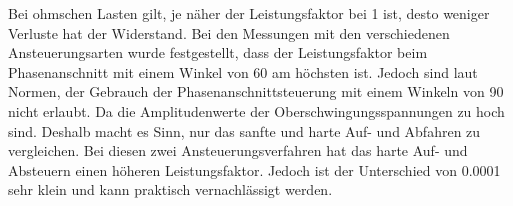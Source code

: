 Bei ohmschen Lasten gilt, je näher der Leistungsfaktor bei 1 ist, desto weniger Verluste hat der Widerstand. Bei den Messungen mit den verschiedenen Ansteuerungsarten wurde festgestellt, dass der Leistungsfaktor beim Phasenanschnitt mit einem Winkel von 60\textdegree \hspace{0.02cm} am höchsten ist. Jedoch sind laut Normen, der Gebrauch der Phasenanschnittsteuerung mit einem Winkeln von 90\textdegree \hspace{0.02cm} nicht erlaubt. Da die Amplitudenwerte der Oberschwingungsspannungen zu hoch sind. Deshalb macht es Sinn, nur das sanfte und harte Auf- und Abfahren zu vergleichen. Bei diesen zwei Ansteuerungsverfahren hat das harte Auf- und Absteuern einen höheren Leistungsfaktor. Jedoch ist der Unterschied von 0.0001 sehr klein und kann praktisch vernachlässigt werden.
 



